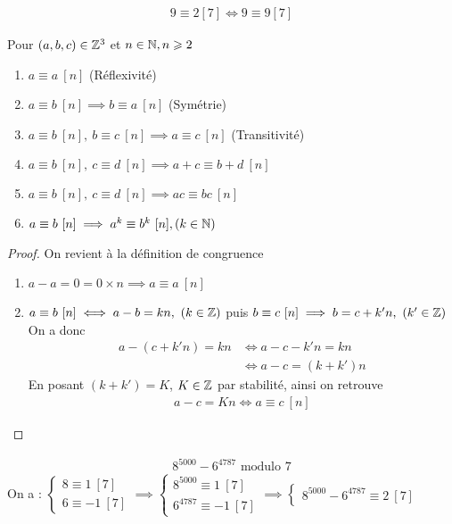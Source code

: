 \begin{exemple}
\begin{align*}
9 \equiv 2 [7] \iff 9 \equiv 9 [7]
\end{align*}
\end{exemple}

\begin{graybox}
\begin{proposition}
Pour $(a, b, c) \in \mathbb{Z}^3$ et $n \in \mathbb{N}, n \geqslant 2$ 
\begin{enumerate}
\item $a \equiv a \ [n]$ (Réflexivité)
\item $a \equiv b \ [n] \implies b \equiv a \ [n]$ (Symétrie)
\item $a \equiv b \ [n],\ b \equiv c \ [n] \implies a \equiv c \ [n]$ (Transitivité)
\item $a \equiv b \ [n],\ c \equiv d \ [n] \implies a + c \equiv b + d \ [n]$
\item $a \equiv b \ [n],\ c \equiv d \ [n] \implies ac \equiv bc \ [n]$
\item $a \equiv b \ [n] \implies a^k \equiv b^k \ [n], (k \in \mathbb{N})$ 
\end{enumerate}
\end{proposition}
\end{graybox}

\begin{proof}
On revient à la définition de congruence
\begin{enumerate}
\item $a - a = 0 = 0 \times n \implies a \equiv a \ [n]$
\item $a \equiv b \ [n] \iff a - b = kn, \ (k \in \mathbb{Z})$ puis $b \equiv c \ [n] \implies b = c + k'n,\ (k' \in \mathbb{Z})$ On a donc
\begin{align*}
a - (c + k'n) = kn &\iff a - c - k'n = kn \\
				   &\iff a - c = (k + k')n 
\end{align*}
En posant $(k + k') = K$, $K \in \mathbb{Z}$ par stabilité, ainsi on retrouve 
\begin{align*}
a - c = Kn \iff a \equiv c \ [n]
\end{align*}  
\end{enumerate}
\end{proof}

\begin{exemple}
\begin{align*}
8^{5000} - 6^{4787} \text{ modulo } 7
\end{align*}
On a : 
$
\begin{cases}
8 \equiv 1 \ [7] \\
6 \equiv -1 \ [7]
\end{cases}
\implies 
\begin{cases}
8^{5000} \equiv 1 \ [7] \\
6^{4787} \equiv -1 \ [7]
\end{cases}
\implies 
\begin{cases}
8^{5000} - 6^{4787} \equiv 2 \ [7]
\end{cases}
$
\end{exemple}

